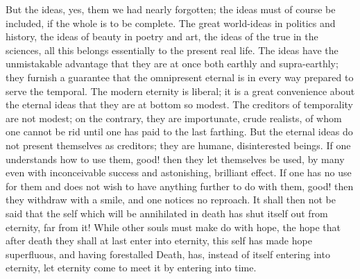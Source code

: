 \documentclass[12pt,a4paper,openany]{book}
\newcommand{\opage}[1]{\marginnote{\footnotesize\textit{[#1]}}}
\begin{document}
But the ideas, yes, them we had nearly forgotten; the ideas
must of course be included, if the whole is to be complete.
The great world-ideas in politics and history, the ideas of beauty
in poetry and art, the ideas of the true in the sciences,
all this belongs essentially to the present
real life. The ideas have the unmistakable advantage
that they are at once both earthly and supra-earthly;
they furnish a guarantee that the omnipresent
eternal is in every way prepared to serve the temporal.
The modern eternity is liberal; it is a great convenience
about the eternal ideas that they are at bottom so modest.
\setcounter{footnote}{0}%
\opage{201}The creditors of temporality are not modest; on the contrary,
they are importunate, crude realists, of whom one cannot
be rid until one has paid to the last farthing.
But the eternal ideas do not present themselves as creditors; they
are humane, disinterested beings. If one understands how to use
them, good! then they let themselves be used, by many even with
inconceivable success and astonishing, brilliant effect. If
one has no use for them and does not wish to have anything further to do
with them, good! then they withdraw with a smile,
and one notices no reproach. It shall then not
be said that the self which will be annihilated in death
has shut itself out from eternity, far from it! While other
souls must make do with hope, the hope that after
death they shall at last enter into eternity, this self
has made hope superfluous, and having forestalled Death, has,
instead of itself entering into eternity, let eternity
come to meet it by entering into time.
\end{document}
